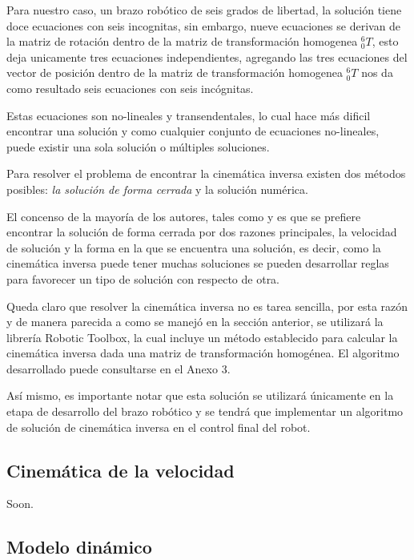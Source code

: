 Para nuestro caso, un brazo robótico de seis grados de libertad, la solución tiene doce ecuaciones con seis incognitas, sin embargo, nueve ecuaciones se derivan de la matriz de rotación dentro de la matriz de transformación homogenea ${}_{0}^{6}T$, esto deja unicamente tres ecuaciones independientes, agregando las tres ecuaciones del vector de posición dentro de la matriz de transformación homogenea ${}_{0}^{6}T$ nos da como resultado seis ecuaciones con seis incógnitas.	

Estas ecuaciones son no-lineales y transendentales, lo cual hace más dificil encontrar una solución y como cualquier conjunto de ecuaciones no-lineales, puede existir una sola solución o múltiples soluciones. \cite{Craig2013}

Para resolver el problema de encontrar la cinemática inversa existen dos métodos posibles: \textit{la solución de forma cerrada} y la solución numérica. 

El concenso de la mayoría de los autores, tales como \cite{Spong2005} y \cite{Craig2013} es que se prefiere encontrar la solución de forma cerrada por dos razones principales, la velocidad de solución y la forma en la que se encuentra una solución, es decir, como la cinemática inversa puede tener muchas soluciones se pueden desarrollar reglas para favorecer un tipo de solución con respecto de otra.

Queda claro que resolver la cinemática inversa no es tarea sencilla, por esta razón y de manera parecida a como se manejó en la sección anterior, se utilizará la librería Robotic Toolbox, la cual incluye un método establecido para calcular la cinemática inversa dada una matriz de transformación homogénea. El algoritmo desarrollado puede consultarse en el Anexo 3.

Así mismo, es importante notar que esta solución se utilizará únicamente en la etapa de desarrollo del brazo robótico y se tendrá que implementar un algoritmo de solución de cinemática inversa en el control final del robot.

\subsection{Cinemática de la velocidad}

Soon.

\subsection{Modelo dinámico}

